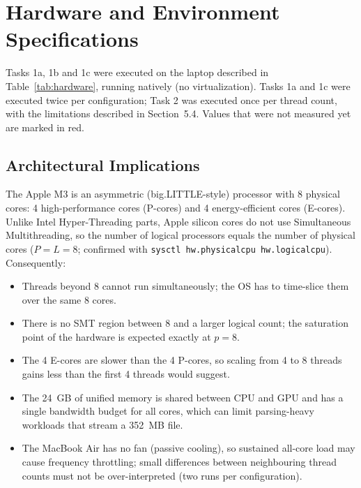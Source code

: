 \documentclass[11pt,a4paper]{article}
\begin{document}
\section{Hardware and Environment Specifications}

Tasks 1a, 1b and 1c were executed on the laptop described in Table~\ref{tab:hardware}, running natively (no virtualization). Tasks 1a and 1c were executed twice per configuration; Task 2 was executed once per thread count, with the limitations described in Section~5.4. Values that were not measured yet are marked in red.

\subsection{Architectural Implications}
The Apple M3 is an asymmetric (big.LITTLE-style) processor with 8 physical cores: 4 high-performance cores (P-cores) and 4 energy-efficient cores (E-cores). Unlike Intel Hyper-Threading parts, Apple silicon cores do not use Simultaneous Multithreading, so the number of logical processors equals the number of physical cores ($P = L = 8$; confirmed with \texttt{sysctl hw.physicalcpu hw.logicalcpu}). Consequently:
\begin{itemize}
    \item Threads beyond 8 cannot run simultaneously; the OS has to time-slice them over the same 8 cores.
    \item There is no SMT region between 8 and a larger logical count; the saturation point of the hardware is expected exactly at $p = 8$.
    \item The 4 E-cores are slower than the 4 P-cores, so scaling from 4 to 8 threads gains less than the first 4 threads would suggest.
    \item The 24~GB of unified memory is shared between CPU and GPU and has a single bandwidth budget for all cores, which can limit parsing-heavy workloads that stream a 352~MB file.
    \item The MacBook Air has no fan (passive cooling), so sustained all-core load may cause frequency throttling; small differences between neighbouring thread counts must not be over-interpreted (two runs per configuration).
\end{itemize}
\end{document}

